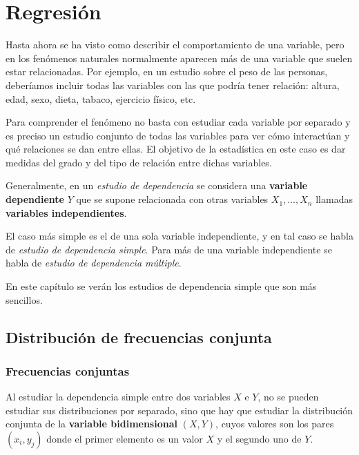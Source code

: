 \documentclass[
  spanish,
  a4paper,
]{scrreport}
\theoremstyle{plain}
\theoremstyle{definition}
\theoremstyle{definition}
\theoremstyle{remark}
\begin{document}

\chapter{Regresión}\label{regresiuxf3n}

Hasta ahora se ha visto como describir el comportamiento de una
variable, pero en los fenómenos naturales normalmente aparecen más de
una variable que suelen estar relacionadas. Por ejemplo, en un estudio
sobre el peso de las personas, deberíamos incluir todas las variables
con las que podría tener relación: altura, edad, sexo, dieta, tabaco,
ejercicio físico, etc.

Para comprender el fenómeno no basta con estudiar cada variable por
separado y es preciso un estudio conjunto de todas las variables para
ver cómo interactúan y qué relaciones se dan entre ellas. El objetivo de
la estadística en este caso es dar medidas del grado y del tipo de
relación entre dichas variables.

Generalmente, en un \emph{estudio de dependencia} se considera una
\textbf{variable dependiente} \(Y\) que se supone relacionada con otras
variables \(X_1,\ldots,X_n\) llamadas \textbf{variables independientes}.

El caso más simple es el de una sola variable independiente, y en tal
caso se habla de \emph{estudio de dependencia simple}. Para más de una
variable independiente se habla de \emph{estudio de dependencia
múltiple}.

En este capítulo se verán los estudios de dependencia simple que son más
sencillos.

\section{Distribución de frecuencias
conjunta}\label{distribuciuxf3n-de-frecuencias-conjunta}

\subsection{Frecuencias conjuntas}\label{frecuencias-conjuntas}

Al estudiar la dependencia simple entre dos variables \(X\) e \(Y\), no
se pueden estudiar sus distribuciones por separado, sino que hay que
estudiar la distribución conjunta de la \textbf{variable bidimensional}
\((X,Y)\), cuyos valores son los pares \((x_i,y_j)\) donde el primer
elemento es un valor \(X\) y el segundo uno de \(Y\).
\end{document}

